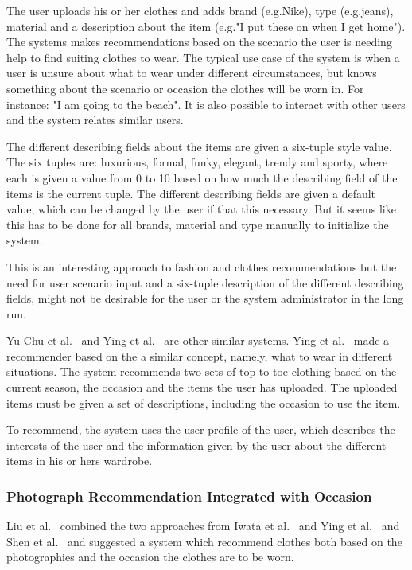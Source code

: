     The user uploads his or her clothes and adds brand (e.g.Nike), type (e.g.jeans), material and a description about the item (e.g."I put these on when I get home").
    The systems makes recommendations based on the scenario the user is needing help to find suiting clothes to wear.
    The typical use case of the system is when a user is unsure about what to wear under different circumstances, but knows something about the scenario or occasion the clothes will be worn in.
    For instance: "I am going to the beach".
    It is also possible to interact with other users and the system relates similar users.

    The different describing fields about the items are given a six-tuple style value.
    The six tuples are: luxurious, formal, funky, elegant, trendy and sporty, where each is given a value from 0 to 10 based on how much the describing field of the items is the current tuple.
    The different describing fields are given a default value, which can be changed by the user if that this necessary. But it seems like this has to be done for all brands, material and type manually to initialize the system.

    This is an interesting approach to fashion and clothes recommendations but the need for user scenario input and a six-tuple description of the different describing fields, might not be desirable for the user or the system administrator in the long run.

    Yu-Chu et al.~\cite{Yu-Chu:2012:PCS:2376365.2376961} and Ying et al.~\cite{Ying2011} are other similar systems. Ying et al.~\cite{Ying2011} made a recommender based on the a similar concept, namely, what to wear in different situations.
    The system recommends two sets of top-to-toe clothing based on the current season, the occasion and the items the user has uploaded.
    The uploaded items must be given a set of descriptions, including the occasion to use the item.

    To recommend, the system uses the user profile of the user, which describes the interests of the user and the information given by the user about the different items in his or hers wardrobe.

\subsubsection{Photograph Recommendation Integrated with Occasion} %
\label{par:photograph_recommendation_integrated_with_occasion}
    Liu et al.~\cite{Liu:2012:HMC:2393347.2393433} combined the two approaches from Iwata et al.~\cite{Iwata:2011} and Ying et al.~\cite{Ying2011} and Shen et al.~\cite{Shen:2007:AIG:1216295.1216368} and suggested a system which recommend clothes both based on the photographies and the occasion the clothes are to be worn.

